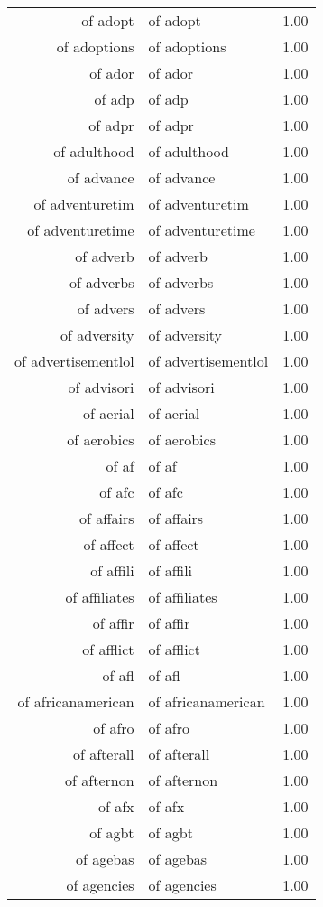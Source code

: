 \begin{table}[ht]
\begin{tabular}{rlr}
  of adopt & of adopt & 1.00 \\ 
  of adoptions & of adoptions & 1.00 \\ 
  of ador & of ador & 1.00 \\ 
  of adp & of adp & 1.00 \\ 
  of adpr & of adpr & 1.00 \\ 
  of adulthood & of adulthood & 1.00 \\ 
  of advance & of advance & 1.00 \\ 
  of adventuretim & of adventuretim & 1.00 \\ 
  of adventuretime & of adventuretime & 1.00 \\ 
  of adverb & of adverb & 1.00 \\ 
  of adverbs & of adverbs & 1.00 \\ 
  of advers & of advers & 1.00 \\ 
  of adversity & of adversity & 1.00 \\ 
  of advertisementlol & of advertisementlol & 1.00 \\ 
  of advisori & of advisori & 1.00 \\ 
  of aerial & of aerial & 1.00 \\ 
  of aerobics & of aerobics & 1.00 \\ 
  of af & of af & 1.00 \\ 
  of afc & of afc & 1.00 \\ 
  of affairs & of affairs & 1.00 \\ 
  of affect & of affect & 1.00 \\ 
  of affili & of affili & 1.00 \\ 
  of affiliates & of affiliates & 1.00 \\ 
  of affir & of affir & 1.00 \\ 
  of afflict & of afflict & 1.00 \\ 
  of afl & of afl & 1.00 \\ 
  of africanamerican & of africanamerican & 1.00 \\ 
  of afro & of afro & 1.00 \\ 
  of afterall & of afterall & 1.00 \\ 
  of afternon & of afternon & 1.00 \\ 
  of afx & of afx & 1.00 \\ 
  of agbt & of agbt & 1.00 \\ 
  of agebas & of agebas & 1.00 \\ 
  of agencies & of agencies & 1.00 \\ 

\end{tabular}
\end{table}
